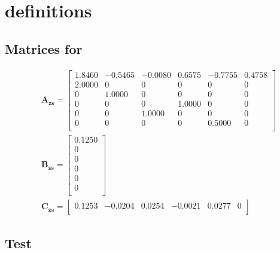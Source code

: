 \chapter{definitions}\label{cha:definition}

\section{Matrices for \abbrRFDC}
\begin{subequations}
  \label{eq:sysmatrices}
  \begin{alignat}{2}
  & \mathbf{A_{zs}} =
    \begin{bmatrix}
  1.8460 &  -0.5465 &  -0.0080 &   0.6575 &  -0.7755 &   0.4758\\
  2.0000 &        0 &        0 &        0 &        0 &        0\\
       0 &   1.0000 &        0 &        0 &        0 &        0\\
       0 &        0 &        0 &   1.0000 &        0 &        0\\
       0 &        0 &   1.0000 &        0 &        0 &        0\\
       0 &        0 &        0 &        0 &   0.5000 &        0\\
    \end{bmatrix}\\
  & \mathbf{B_{zs}} =
  \begin{bmatrix}
    0.1250\\
         0\\
         0\\
         0\\
         0\\
         0\\
  \end{bmatrix} \\
  & \mathbf{C_{zs}} =
  \begin{bmatrix}
      0.1253  & -0.0204  &  0.0254  & -0.0021  &  0.0277     &    0\\
  \end{bmatrix}
  \end{alignat}
\end{subequations}

\section{Test}
